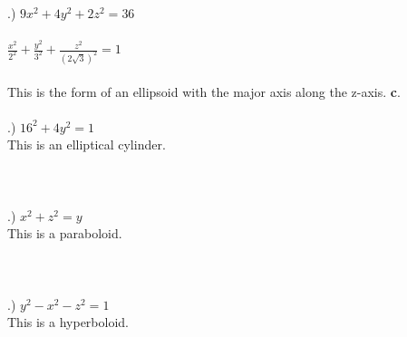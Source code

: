 \documentclass[12pt]{article}
\begin{document}
.) $9x^{2}+4y^{2}+2z^{2}=36$\\\\
\noindent $\frac{x^{2}}{2^{2}} + \frac{y^{2}}{3^{2}} + \frac{z^{2}}{(2\sqrt{3})^{2}} = 1$ \\\\
\noindent This is the form of an ellipsoid with the major axis along the z-axis. \textbf{c}.\\\\

.) $16^{2} + 4y^{2} = 1$\\
\noindent This is an elliptical cylinder.\\\\\\\\
.) $x^{2}+z^{2}=y$\\
\noindent This is a paraboloid.\\\\\\\\
.) $y^{2}-x^{2}-z^{2}=1$\\
\noindent This is a hyperboloid.\\\\\\\\
\end{document}
